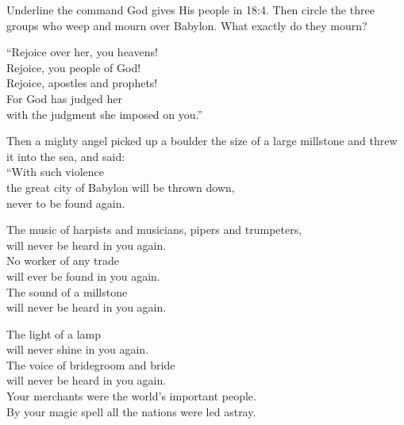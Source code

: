 \begin{ScriptureBox2}{Underline the command God gives His people in 18:4. Then circle the three groups who weep and mourn over Babylon. What exactly do they mourn?}
\item[18:20] \hspace*{1em}``Rejoice over her, you heavens!\\
\hspace*{2em}Rejoice, you people of God!\\
\hspace*{2em}Rejoice, apostles and prophets!\\
\hspace*{1em}For God has judged her\\
\hspace*{2em}with the judgment she imposed on you.''

\item[18:21] Then a mighty angel picked up a boulder the size of a large millstone and threw it into the sea, and said:\\
\hspace*{1em}``With such violence\\
\hspace*{2em}the great city of Babylon will be thrown down,\\
\hspace*{2em}never to be found again.

\item[18:22] \hspace*{1em}The music of harpists and musicians, pipers and trumpeters,\\
\hspace*{2em}will never be heard in you again.\\
\hspace*{1em}No worker of any trade\\
\hspace*{2em}will ever be found in you again.\\
\hspace*{1em}The sound of a millstone\\
\hspace*{2em}will never be heard in you again.

\item[18:23] \hspace*{1em}The light of a lamp\\
\hspace*{2em}will never shine in you again.\\
\hspace*{1em}The voice of bridegroom and bride\\
\hspace*{2em}will never be heard in you again.\\
\hspace*{1em}Your merchants were the world's important people.\\
\hspace*{2em}By your magic spell all the nations were led astray.


\end{ScriptureBox2}
